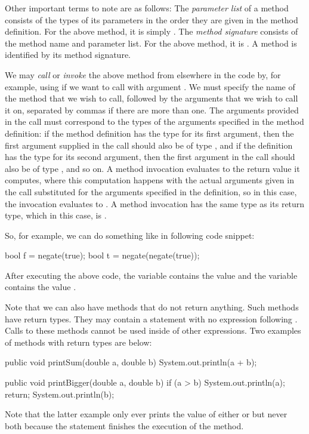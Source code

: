 Other important terms to note are as follows:
The \emph{parameter list} of a method consists of the types of its parameters in the
order they are given in the method definition.
For the above method, it is simply .
The \emph{method signature} consists of the method name and parameter list.
For the above method, it is .
A method is identified by its method signature.

We may \emph{call} or \emph{invoke} the above method from elsewhere in the code by,
for example, using  if we want to call  with argument
.
We must specify the name of the method that we wish to call, followed by the arguments
that we wish to call it on, separated by commas if there are more than one.
The arguments provided in the call must correspond to the types of the arguments
specified in the method definition: if the method definition has the type 
for its first argument, then the first argument supplied in the call should also be
of type , and if the definition has the type  for its second argument,
then the first argument in the call should also be of type , and so on.
A method invocation evaluates to the return value it computes, where this
computation happens with the actual arguments
given in the call substituted for the arguments specified in the definition, so in
this case, the invocation  evaluates to .
A method invocation has the same type as its return type, which in this case, is .

So, for example, we can do something like in following code snippet:
\begin{code}
  bool f = negate(true);
  bool t = negate(negate(true));
\end{code}
After executing the above code, the variable  contains the value 
and the variable  contains the value .

Note that we can also have methods that do not return anything. Such
methods have  return types. They may contain a 
statement with no expression following .
Calls to these methods cannot be used inside of other expressions.
Two examples of methods with  return types are below:
\begin{code}
public void printSum(double a, double b) {
  System.out.println(a + b);
}
\end{code}

\begin{code}
public void printBigger(double a, double b) {
  if (a > b) {
    System.out.println(a);
    return;
  }
  System.out.println(b);
}
\end{code}
Note that the latter example only ever prints the value of either  or  but
never both because
the  statement finishes the execution of the method.

